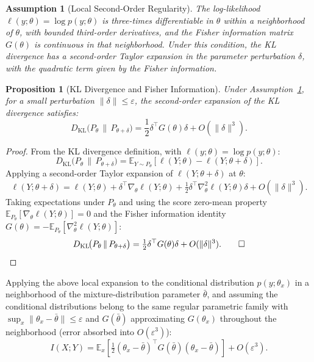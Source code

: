 \documentclass[lettersize,journal]{IEEEtran}
\newtheorem{proposition}{Proposition}
\newtheorem{assumption}{Assumption}
\newcommand{\E}{\mathbb{E}}
\begin{document}
\begin{assumption}[Local Second-Order Regularity]\label{ass:local-euclidean}
The log-likelihood $\ell(y;\theta)=\log p(y;\theta)$ is three-times
differentiable in $\theta$ within a neighborhood of $\theta$, with bounded
third-order derivatives, and the Fisher information matrix $G(\theta)$ is
continuous in that neighborhood.
Under this condition, the KL divergence has a second-order Taylor expansion
in the parameter perturbation $\delta$, with the quadratic term given by
the Fisher information.
\end{assumption}

\begin{proposition}[KL Divergence and Fisher Information]\label{prop:kl-fim}
Under Assumption~\ref{ass:local-euclidean}, for a small perturbation
$\|\delta\|\leq \varepsilon$, the second-order expansion of the KL
divergence satisfies:
\begin{equation}\label{eq:kl-fim}
D_{\mathrm{KL}}\!\big(P_{\theta}\,\|\,P_{\theta+\delta}\big)
  = \frac{1}{2}\delta^\top G(\theta)\delta + O(\|\delta\|^3).
\end{equation}
\end{proposition}

\begin{proof}
From the KL divergence definition, with $\ell(y;\theta)=\log p(y;\theta)$:
\[
D_{\mathrm{KL}}\!\big(P_{\theta}\,\|\,P_{\theta+\delta}\big)
  =\E_{Y\sim P_\theta}\!\left[\ell(Y;\theta)-\ell(Y;\theta+\delta)\right].
\]
Applying a second-order Taylor expansion of $\ell(Y;\theta+\delta)$ at $\theta$:
\[
\ell(Y;\theta+\delta)=\ell(Y;\theta)+\delta^\top \nabla_\theta \ell(Y;\theta)
  +\tfrac{1}{2}\delta^\top \nabla_\theta^2\ell(Y;\theta)\delta+O(\|\delta\|^3).
\]
Taking expectations under $P_\theta$ and using the score zero-mean property
$\E_{P_\theta}[\nabla_\theta \ell(Y;\theta)]=0$ and the Fisher information
identity $G(\theta)=-\E_{P_\theta}[\nabla_\theta^2\ell(Y;\theta)]$:
\[
D_{\mathrm{KL}}\!\big(P_{\theta}\,\|\,P_{\theta+\delta}\big)
  =\tfrac{1}{2}\delta^\top G(\theta)\delta+O(\|\delta\|^3). \qed
\]
\end{proof}

Applying the above local expansion to the conditional distribution
$p(y;\theta_x)$ in a neighborhood of the mixture-distribution parameter
$\bar\theta$, and assuming the conditional distributions belong to the same
regular parametric family with $\sup_x \|\theta_x-\bar\theta\| \leq \varepsilon$
and $G(\bar\theta)$ approximating $G(\theta_x)$ throughout the neighborhood
(error absorbed into $O(\varepsilon^3)$):
\begin{equation}\label{eq:mi-approx}
I(X;Y) = \E_x\!\left[\tfrac{1}{2}(\theta_x-\bar\theta)^\top
  G(\bar\theta)(\theta_x-\bar\theta)\right] + O\!\left(\varepsilon^3\right).
\end{equation}
\end{document}
